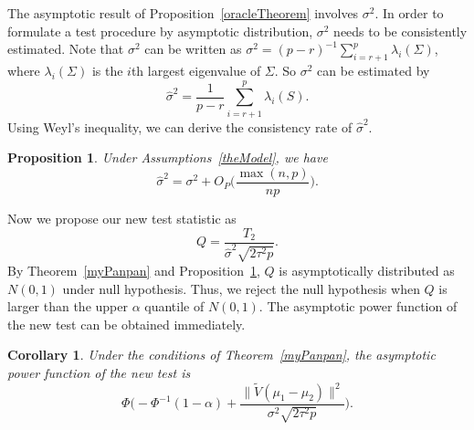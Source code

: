 \documentclass[review]{elsarticle}
\theoremstyle{plain}
\newtheorem{proposition}{\quad\quad Proposition}
\newtheorem{corollary}{\quad\quad Corollary}
\theoremstyle{definition}
\newtheorem{remark}{\quad\quad Remark}
\theoremstyle{remark}
\begin{document}


The asymptotic result of Proposition~\ref{oracleTheorem} involves $\sigma^2$.
In order to formulate a test procedure by asymptotic distribution, $\sigma^2$ needs to be consistently estimated.
Note that $\sigma^2$ can be written as
    $\sigma^2={(p-r)}^{-1}\sum_{i=r+1}^{p}\lambda_i(\Sigma)$, where $\lambda_i(\Sigma)$ is the $i$th largest eigenvalue of $\Sigma$.
So $\sigma^2$ can be estimated by
\begin{equation*}
    \hat{\sigma}^2=\frac{1}{p-r}\sum_{i=r+1}^{p} \lambda_i(S).
\end{equation*}
 Using Weyl's inequality, we can derive the consistency rate of $\hat{\sigma}^2$.
\begin{proposition}\label{varianceEstimation}
    Under Assumptions~\ref{theModel}, we have %
    $$
    \hat{\sigma}^2=\sigma^2 + O_P\Big(\frac{\max (n,p)}{np}\Big).
    $$
\end{proposition}
Now we propose our new test statistic as
    $$
    Q=\frac{T_2}{\hat{\sigma}^2\sqrt{2\tau^2 p}}.
    $$
By Theorem~\ref{myPanpan} and Proposition~\ref{varianceEstimation}, $Q$ is asymptotically distributed as $N(0,1)$ under null hypothesis.
Thus, we reject the null hypothesis when $Q$ is larger than the upper $\alpha$ quantile of $N(0,1)$.
The asymptotic power function of the new test can be obtained immediately.
\begin{corollary}\label{testPowerh}
    Under the conditions of Theorem~\ref{myPanpan}, the asymptotic power function of the new test is
    \begin{equation*}
        \Phi\Big(-\Phi^{-1}(1-\alpha)+\frac{\|\tilde{V}(\mu_1-\mu_2)\|^2}{\sigma^2\sqrt{2\tau^2p}}\Big).
    \end{equation*}
\end{corollary}
\end{document}
